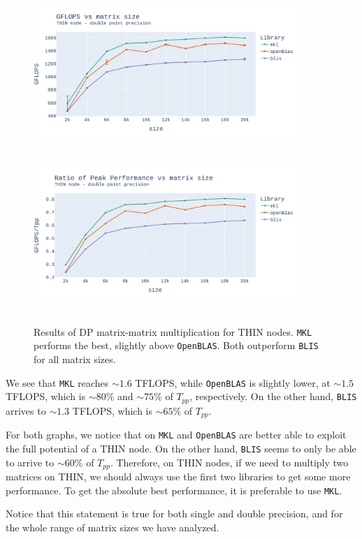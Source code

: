 \documentclass{report}
\begin{document}
\begin{figure}[h!]
\hspace*{-2.5cm}
\includegraphics[width=10cm, height=6cm]{./images/fixed_cores_thin_double_gflops.pdf}
\includegraphics[width=10cm, height=6cm]{./images/fixed_cores_thin_double_gflops_ratio.pdf}
\caption{\label{fig:fixed_cores_thin_double} Results of DP matrix-matrix multiplication 
for THIN nodes. \texttt{MKL} performs the best, slightly above \texttt{OpenBLAS}. 
Both outperform \texttt{BLIS} for all matrix sizes.}
\end{figure}
We see that \texttt{MKL} reaches $\sim1.6$ TFLOPS, 
while \texttt{OpenBLAS} is slightly lower, at $\sim1.5$ TFLOPS, which is $\sim80\%$ and 
$\sim75\%$ of $T_{pp}$, respectively. On the other hand, \texttt{BLIS} arrives to 
$\sim1.3$ TFLOPS, which is $\sim65\%$ of $T_{pp}$.

For both graphs, we notice that on \texttt{MKL} and \texttt{OpenBLAS} are better 
able to exploit the full potential of a THIN node. On the other hand, \texttt{BLIS}
seems to only be able to arrive to $\sim 60\%$ of $T_{pp}$. Therefore, on THIN nodes, 
if we need to multiply two matrices on THIN, we should always use the first 
two libraries to get some more performance. To get the absolute best performance, 
it is preferable to use \texttt{MKL}.

Notice that this statement is true for both single and double precision, and for 
the whole range of matrix sizes we have analyzed. 
\end{document}
